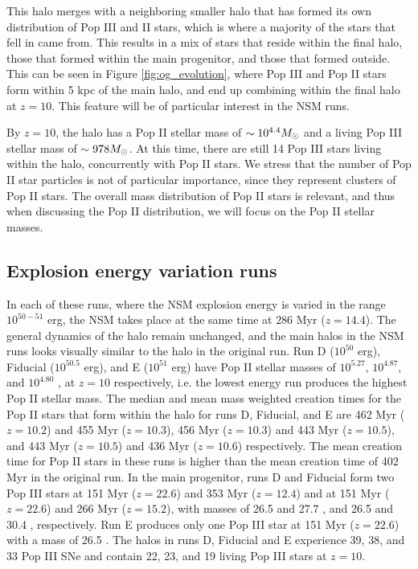 \documentclass[fleqn,usenatbib]{mnras}
\begin{document}
This halo merges with a neighboring smaller halo that has formed its own distribution of Pop III and II stars, which is where a majority of the stars that fell in came from. This results in a mix of stars that reside within the final halo, those that formed within the main progenitor, and those that formed outside. This can be seen in Figure \ref{fig:og_evolution}, where Pop III and Pop II stars form within 5 kpc of the main halo, and end up combining within the final halo at $z = 10$. This feature will be of particular interest in the NSM runs. 

By $z = 10$, the halo has a Pop II stellar mass of $\sim 10^{4.4} \Ms$ and a living Pop III stellar mass of $\sim 978 \Ms$. At this time, there are still 14 Pop III stars living within the halo, concurrently with Pop II stars. We stress that the number of Pop II star particles is not of particular importance, since they represent clusters of Pop II stars. The overall mass distribution of Pop II stars is relevant, and thus when discussing the Pop II distribution, we will focus on the Pop II stellar masses. 

\subsection{Explosion energy variation runs} \label{sec:energy_vary}

In each of these runs, where the NSM explosion energy is varied in the range $10^{50 - 51}$ erg, the NSM takes place at the same time at $286$ Myr ($z = 14.4$). The general dynamics of the halo remain unchanged, and the main halos in the NSM runs looks visually similar to the halo in the original run. Run D ($10^{50}$ erg), Fiducial ($10^{50.5}$ erg), and E ($10^{51}$ erg) have Pop II stellar masses of $10^{5.27}$, $10^{4.87}$, and $10^{4.80}$ \Ms{}, at $z = 10$ respectively, i.e. the lowest energy run produces the highest Pop II stellar mass. The median and mean mass weighted creation times for the Pop II stars that form within the halo for runs D, Fiducial, and E are 462 Myr ($z = 10.2$) and 455 Myr ($z = 10.3$), 456 Myr ($z = 10.3$) and 443 Myr ($z = 10.5$), and 443 Myr ($z = 10.5$) and 436 Myr ($z = 10.6$) respectively. The mean creation time for Pop II stars in these runs is higher than the mean creation time of 402 Myr in the original run. In the main progenitor, runs D and Fiducial form two Pop III stars at 151 Myr ($z = 22.6$) and 353 Myr ($z = 12.4$) and at 151 Myr ($z = 22.6$) and 266 Myr ($z = 15.2$), with masses of 26.5 \Ms{} and 27.7 \Ms{}, and 26.5 \Ms{} and 30.4 \Ms, respectively. Run E produces only one Pop III star at 151 Myr ($z = 22.6$) with a mass of 26.5 \Ms{}. The halos in runs D, Fiducial and E experience 39, 38, and 33 Pop III SNe and contain 22, 23, and 19 living Pop III stars at $z = 10$.
\end{document}
